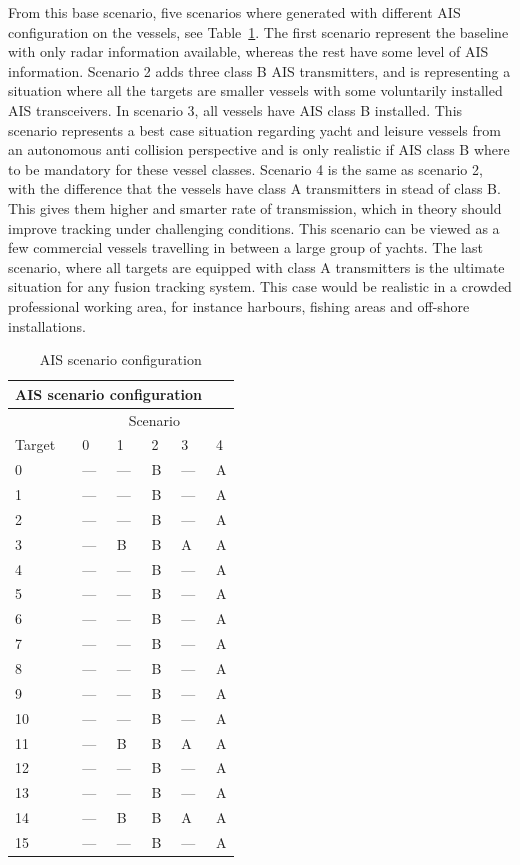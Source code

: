 From this base scenario, five scenarios where generated with different AIS configuration on the vessels, see Table~\ref{tab:ais_scenarios}. The first scenario represent the baseline with only radar information available, whereas the rest have some level of AIS information. Scenario 2 adds three class B AIS transmitters, and is representing a situation where all the targets are smaller vessels with some voluntarily installed AIS transceivers. In scenario 3, all vessels have AIS class B installed. This scenario represents a best case situation regarding yacht and leisure vessels from an autonomous anti collision perspective and is only realistic if AIS class B where to be mandatory for these vessel classes. Scenario 4 is the same as scenario 2, with the difference that the vessels have class A transmitters in stead of class B. This gives them higher and smarter rate of transmission, which in theory should improve tracking under challenging conditions. This scenario can be viewed as a few commercial vessels travelling in between a large group of yachts. The last scenario, where all targets are equipped with class A transmitters is the ultimate situation for any fusion tracking system. This case would be realistic in a crowded professional working area, for instance harbours, fishing areas and off-shore installations. 
\begin{table}
\centering
	\begin{tabularx}{0.5\textwidth}{XXXXXX}
	  \multicolumn{5}{c}{AIS scenario configuration} \\
	  \toprule
	  		 & \multicolumn{5}{c}{Scenario} \\
	  Target & 0 	& 1 	&  2 	&  3	& 4  	\\
	  \midrule
	  0 	& --- 	& --- 	& B 	& --- 	& A 	\\
	  1 	& --- 	& --- 	& B 	& --- 	& A 	\\
	  2 	& --- 	& --- 	& B 	& --- 	& A 	\\
	  3 	& ---	& B 	& B 	& A 	& A 	\\
	  4 	& --- 	& --- 	& B 	& --- 	& A 	\\
	  5 	& --- 	& --- 	& B 	& --- 	& A 	\\
	  6 	& --- 	& --- 	& B 	& --- 	& A 	\\
	  7 	& --- 	& --- 	& B 	& --- 	& A 	\\
	  8 	& --- 	& --- 	& B 	& --- 	& A 	\\
	  9 	& --- 	& --- 	& B 	& --- 	& A 	\\
	  10 	& --- 	& --- 	& B 	& --- 	& A 	\\
	  11	& ---	& B 	& B 	& A 	& A 	\\
	  12 	& --- 	& --- 	& B 	& --- 	& A 	\\
	  13 	& --- 	& --- 	& B 	& --- 	& A 	\\
	  14 	& ---	& B 	& B 	& A 	& A 	\\
	  15 	& --- 	& --- 	& B 	& --- 	& A 	\\
	  \bottomrule
	\end{tabularx}~\caption{AIS scenario configuration}\label{tab:ais_scenarios}
\end{table}

